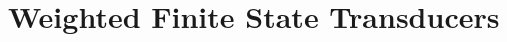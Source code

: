\begin{comment}
	\pagebreak
\end{comment}

\section{Weighted Finite State Transducers}
\begin{comment}
\subsection{Structure}

	\begin{itemize}
	
	\item WFSTs
	\begin{itemize}
	\item Big Picture
	\item Projectivity
	\item Decombosable Score Function
	\end{itemize}
	
	\item Floyd Warshal
	\begin{itemize}
	\item Floyd Warshal Recap
	\item Matrix Multiplication
	\item Semirings
	\item FW as MM
	\end{itemize}
	
	\item Finding Normalization Constant
	\begin{itemize}
	\item Computing infinite Sums
	\item Warshal-Floyd-Kleene
	\item Back to WFSTs
	\end{itemize}	
	\end{itemize}
\end{comment}

\begin{comment}
	\textbf{Weighted finite state transducer}: 
	Transducer maps sequences to another. They are used in Speech recognition, machine translation or transliteration (Map strings in one character set to another set).\\
	The transducers are finite state because we have a finite set of states, e.g. the non-terminals and terminals.
	They are weighted Weighted because we weight the probability of the transitions between the states.\\
\end{comment} 

